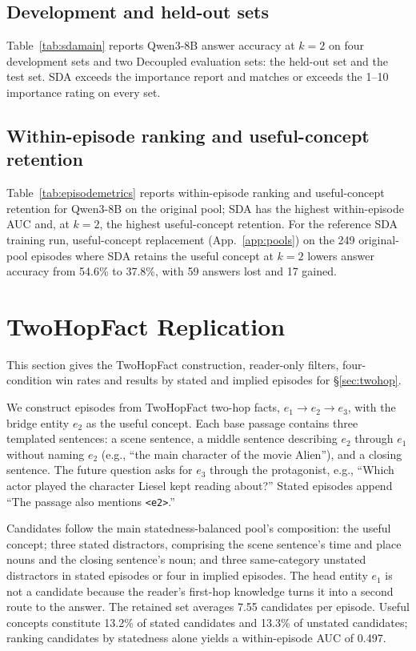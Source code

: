 \subsection{Development and held-out sets}
\label{app:heldout}
Table~\ref{tab:sdamain} reports Qwen3-8B answer accuracy at $k=2$ on four development sets and two Decoupled evaluation sets: the held-out set and the test set. SDA exceeds the importance report and matches or exceeds the 1--10 importance rating on every set.



\subsection{Within-episode ranking and useful-concept retention}
\label{app:episodemetrics}

Table~\ref{tab:episodemetrics} reports within-episode ranking and useful-concept retention for Qwen3-8B on the original pool; SDA has the highest within-episode AUC and, at $k=2$, the highest useful-concept retention. For the reference SDA training run, useful-concept replacement (App.~\ref{app:pools}) on the 249 original-pool episodes where SDA retains the useful concept at $k=2$ lowers answer accuracy from 54.6\% to 37.8\%, with 59 answers lost and 17 gained.



\section{TwoHopFact Replication}\label{app:twohop}
This section gives the TwoHopFact construction, reader-only filters, four-condition win rates and results by stated and implied episodes for \S\ref{sec:twohop}.

We construct episodes from TwoHopFact \citep{yang2024latent} two-hop facts, $e_1 \rightarrow e_2 \rightarrow e_3$, with the bridge entity $e_2$ as the useful concept. Each base passage contains three templated sentences: a scene sentence, a middle sentence describing $e_2$ through $e_1$ without naming $e_2$ (e.g., ``the main character of the movie Alien''), and a closing sentence. The future question asks for $e_3$ through the protagonist, e.g., ``Which actor played the character Liesel kept reading about?'' Stated episodes append ``The passage also mentions \texttt{<e2>}.''

Candidates follow the main statedness-balanced pool's composition: the useful concept; three stated distractors, comprising the scene sentence's time and place nouns and the closing sentence's noun; and three same-category unstated distractors in stated episodes or four in implied episodes. The head entity $e_1$ is not a candidate because the reader's first-hop knowledge turns it into a second route to the answer. The retained set averages 7.55 candidates per episode. Useful concepts constitute 13.2\% of stated candidates and 13.3\% of unstated candidates; ranking candidates by statedness alone yields a within-episode AUC of 0.497.

